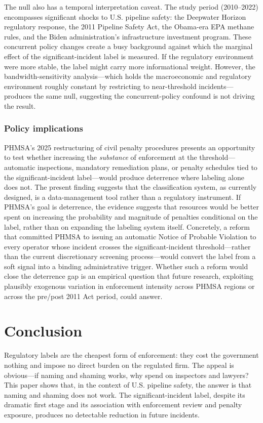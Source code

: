 \documentclass[12pt]{article}
\begin{document}
The null also has a temporal interpretation caveat. The study period (2010--2022) encompasses significant shocks to U.S. pipeline safety: the Deepwater Horizon regulatory response, the 2011 Pipeline Safety Act, the Obama-era EPA methane rules, and the Biden administration's infrastructure investment program. These concurrent policy changes create a busy background against which the marginal effect of the significant-incident label is measured. If the regulatory environment were more stable, the label might carry more informational weight. However, the bandwidth-sensitivity analysis---which holds the macroeconomic and regulatory environment roughly constant by restricting to near-threshold incidents---produces the same null, suggesting the concurrent-policy confound is not driving the result.

\subsubsection*{Policy implications} PHMSA's 2025 restructuring of civil penalty procedures presents an opportunity to test whether increasing the \textit{substance} of enforcement at the threshold---automatic inspections, mandatory remediation plans, or penalty schedules tied to the significant-incident label---would produce deterrence where labeling alone does not. The present finding suggests that the classification system, as currently designed, is a data-management tool rather than a regulatory instrument. If PHMSA's goal is deterrence, the evidence suggests that resources would be better spent on increasing the probability and magnitude of penalties conditional on the label, rather than on expanding the labeling system itself. Concretely, a reform that committed PHMSA to issuing an automatic Notice of Probable Violation to every operator whose incident crosses the significant-incident threshold---rather than the current discretionary screening process---would convert the label from a soft signal into a binding administrative trigger. Whether such a reform would close the deterrence gap is an empirical question that future research, exploiting plausibly exogenous variation in enforcement intensity across PHMSA regions or across the pre/post 2011 Act period, could answer.


\section{Conclusion}
\label{sec:conclusion}

Regulatory labels are the cheapest form of enforcement: they cost the government nothing and impose no direct burden on the regulated firm. The appeal is obvious---if naming and shaming works, why spend on inspectors and lawyers? This paper shows that, in the context of U.S. pipeline safety, the answer is that naming and shaming does not work. The significant-incident label, despite its dramatic first stage and its association with enforcement review and penalty exposure, produces no detectable reduction in future incidents.
\end{document}
